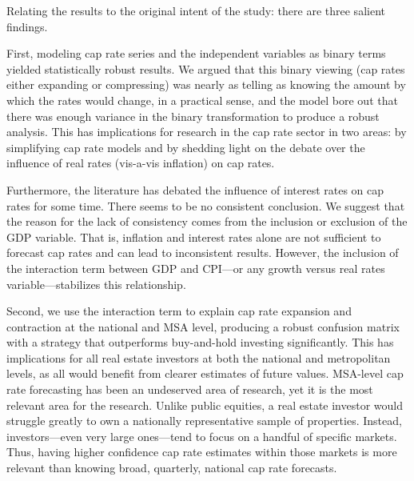 \documentclass[jrfm,article,accept,oneauthor,pdftex]{Definitions/mdpi}
\begin{document}
Relating the results to the original intent of the study: there are three salient findings.

First, modeling cap rate series and the independent variables as binary terms yielded statistically robust results. We argued that this binary viewing (cap rates either expanding or compressing) was nearly as telling as knowing the amount by which the rates would change, in a practical sense, and the model bore out that there was enough variance in the binary transformation to produce a robust analysis. This has implications for research in the cap rate sector in two areas: by simplifying cap rate models and by shedding light on the debate over the influence of real rates (vis-a-vis inflation) on cap rates.

Furthermore, the literature has debated the influence of interest rates on cap rates for some time. There seems to be no consistent conclusion. We suggest that the reason for the lack of consistency comes from the inclusion or exclusion of the GDP variable. That is, inflation and interest rates alone are not sufficient to forecast cap rates and can lead to inconsistent results. However, the inclusion of the interaction term between GDP and CPI---or any growth versus real rates variable---stabilizes this relationship.

Second, we use the interaction term to explain cap rate expansion and contraction at the national and MSA level, producing a robust confusion matrix with a strategy that outperforms buy-and-hold investing significantly. This has implications for all real estate investors at both the national and metropolitan levels, as all would benefit from clearer estimates of future values. MSA-level cap rate forecasting has been an undeserved area of research, yet it is the most relevant area for the research. Unlike public equities, a real estate investor would struggle greatly to own a nationally representative sample of properties. Instead, investors---even very large ones---tend to focus on a handful of specific markets. Thus, having higher confidence cap rate estimates within those markets is more relevant than knowing broad, quarterly, national cap rate forecasts.
\end{document}
